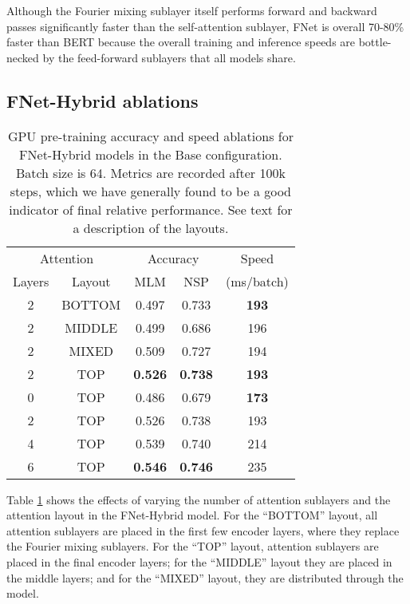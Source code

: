 \documentclass[11pt]{article}
\begin{document}
Although the Fourier mixing sublayer itself performs forward and backward passes significantly faster than the self-attention sublayer, FNet is overall 70-80\% faster than BERT because the overall training and inference speeds are bottle-necked by the feed-forward sublayers that all models share.

\subsection{FNet-Hybrid ablations}
\label{app:hybrid_ablations}

\begin{table}
    \caption{GPU pre-training accuracy and speed ablations for FNet-Hybrid models in the Base configuration. Batch size is 64. Metrics are recorded after 100k steps, which we have generally found to be a good indicator of final relative performance. See text for a description of the layouts.}
    \label{tab:hybrid_ablations}
    \setlength{\tabcolsep}{4pt}
    \centering
    \begin{tabular}{c c | c c | c}
        \hline
        \multicolumn{2}{c|}{Attention} & \multicolumn{2}{c|}{Accuracy} & Speed \\
        Layers & Layout & MLM & NSP & (ms/batch) \\ \hline \hline
        2 & BOTTOM & 0.497 & 0.733 & \textbf{193} \\
        2 & MIDDLE & 0.499 & 0.686 & 196 \\
        2 & MIXED & 0.509 &	0.727 &	194 \\
        2 & TOP & \textbf{0.526} &	\textbf{0.738} &	\textbf{193} \\ \hline
        0 & TOP & 0.486 &	0.679 &	\textbf{173} \\
        2 & TOP & 0.526 &	0.738 &	193 \\
        4 & TOP & 0.539 &	0.740 &	214 \\
        6 & TOP & \textbf{0.546} & \textbf{0.746}	& 235 \\ \hline
    \end{tabular}
\end{table}

Table \ref{tab:hybrid_ablations} shows the effects of varying the number of attention sublayers and the attention layout in the FNet-Hybrid model. For the ``BOTTOM'' layout, all attention sublayers are placed in the first few encoder layers, where they replace the Fourier mixing sublayers. For the ``TOP'' layout, attention sublayers are placed in the final encoder layers; for the ``MIDDLE'' layout they are placed in the middle layers; and for the ``MIXED'' layout, they are distributed through the model.
\end{document}
